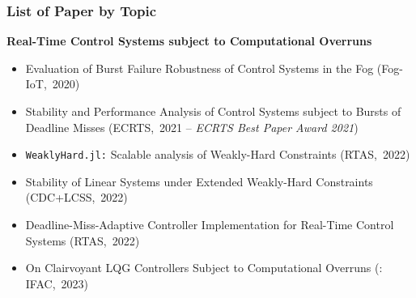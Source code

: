 \begin{frame}
    \frametitle{List of Paper by Topic}
    \textbf{Real-Time Control Systems subject to Computational Overruns}

    \begin{itemize}
        \item \textcolor<2>{black!25!white}{Evaluation of Burst Failure Robustness of Control Systems in the Fog (Fog-IoT,~2020)}
        \item Stability and Performance Analysis of Control Systems subject to Bursts of Deadline Misses (ECRTS,~2021 -- \emph{ECRTS Best Paper Award 2021})
        \item \texttt{WeaklyHard.jl:} Scalable analysis of Weakly-Hard Constraints (RTAS,~2022)
        \item Stability of Linear Systems under Extended Weakly-Hard Constraints (CDC+LCSS,~2022)
        \item Deadline-Miss-Adaptive Controller Implementation for Real-Time Control Systems (RTAS,~2022)
        \item On Clairvoyant LQG Controllers Subject to Computational Overruns (: IFAC,~2023)
    \end{itemize}
\end{frame}
